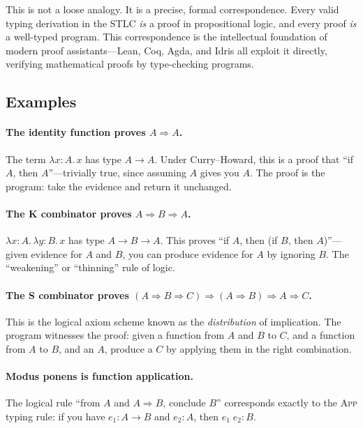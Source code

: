 \documentclass[11pt,a4paper]{article}
\theoremstyle{definition}
\newcommand{\lam}{\lambda}
\begin{document}
This is not a loose analogy. It is a precise, formal correspondence. Every
valid typing derivation in the STLC \emph{is} a proof in propositional logic,
and every proof \emph{is} a well-typed program. This correspondence is the
intellectual foundation of modern proof assistants---Lean, Coq, Agda, and
Idris all exploit it directly, verifying mathematical proofs by type-checking
programs.

\subsection{Examples}

\paragraph{The identity function proves $A \Rightarrow A$.}
The term $\lam x{:}A.\, x$ has type $A \to A$. Under Curry--Howard, this is
a proof that ``if $A$, then $A$''---trivially true, since assuming $A$ gives
you $A$. The proof is the program: take the evidence and return it unchanged.

\paragraph{The K combinator proves $A \Rightarrow B \Rightarrow A$.}
$\lam x{:}A.\, \lam y{:}B.\, x$ has type $A \to B \to A$. This proves
``if $A$, then (if $B$, then $A$)''---given evidence for $A$ and $B$, you
can produce evidence for $A$ by ignoring $B$. The ``weakening'' or
``thinning'' rule of logic.

\paragraph{The S combinator proves $(A \Rightarrow B \Rightarrow C) \Rightarrow (A \Rightarrow B) \Rightarrow A \Rightarrow C$.}
This is the logical axiom scheme known as the \emph{distribution} of
implication. The program witnesses the proof: given a function from $A$ and $B$
to $C$, and a function from $A$ to $B$, and an $A$, produce a $C$ by applying
them in the right combination.

\paragraph{Modus ponens is function application.}
The logical rule ``from $A$ and $A \Rightarrow B$, conclude $B$'' corresponds
exactly to the \textsc{App} typing rule: if you have $e_1 : A \to B$ and
$e_2 : A$, then $e_1\;e_2 : B$.
\end{document}
